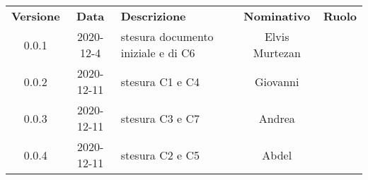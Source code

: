 {
    \renewcommand{\arraystretch}{1.5}
    \centering
    \begin{longtable}{ c c  C{4cm}  c  c }
        \rowcolor{\primaryColor}
        \textcolor{\secondaryColor}{
        \textbf{Versione}}     & \textcolor{\secondaryColor}{\textbf{Data}}       & \textcolor{\secondaryColor}
        {\textbf{Descrizione}} & \textcolor{\secondaryColor}{\textbf{Nominativo}} & \textcolor{\secondaryColor}{\textbf{Ruolo}}                          \\


        0.0.1                  & 2020-12-4                                       & stesura documento iniziale e di C6 & Elvis Murtezan & \responsabile{} \\
        0.0.2                  & 2020-12-11                                       & stesura C1 e C4   					& Giovanni & \redattore{} \\
        0.0.3                  & 2020-12-11                                       & stesura C3 e C7    					& Andrea & \redattore{}    \\
		0.0.4                  & 2020-12-11                                       & stesura C2 e C5                     & Abdel & \redattore{}    \\
    \end{longtable}
}